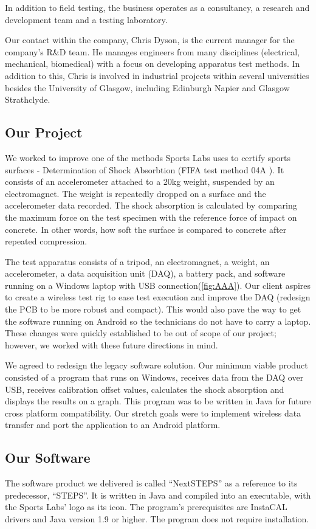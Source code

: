 \documentclass{l3proj}
\begin{document}
In addition to field testing, the business  operates as a consultancy, a research and development team and a testing laboratory.

Our contact within the company, Chris Dyson, is the current manager for the company's R\&D team. He manages engineers from many disciplines (electrical, mechanical, biomedical) with a focus on developing apparatus test methods. In addition to this, Chris is involved in industrial projects within several universities besides the University of Glasgow, including Edinburgh Napier and Glasgow Strathclyde.  
\subsection{Our Project}
We worked to improve one of the methods Sports Labs uses to certify sports surfaces - Determination of Shock Absorbtion (FIFA test method 04A \cite{fifa}). It consists of an accelerometer attached to a 20kg weight, suspended by an electromagnet. The weight is repeatedly dropped on a surface and the accelerometer data recorded. The shock absorption is calculated by comparing the maximum force on the test specimen with the reference force of impact on concrete\cite{fifa}. In other words, how soft the surface is compared to concrete after repeated compression. 

The test apparatus consists of a tripod, an electromagnet, a weight, an accelerometer, a data acquisition unit (DAQ), a battery pack, and software running on a Windows laptop with USB connection(\ref{fig:AAA}). Our client aspires to create a wireless test rig to ease test execution and improve the DAQ (redesign the PCB to be more robust and compact). This would also pave the way to get the software running on Android so the technicians do not have to carry a laptop. These changes were quickly established to be out of scope of our project; however, we worked with these future directions in mind. 

We agreed to redesign the legacy software solution. Our minimum viable product consisted of a program that runs on Windows, receives data from the DAQ over USB, receives calibration offset values, calculates the shock absorption and displays the results on a graph. This program was to be written in Java for future cross platform compatibility. Our stretch goals were to implement wireless data transfer and port the application to an Android platform.


\subsection{Our Software}
The software product we delivered is called ``NextSTEPS'' as a reference to its predecessor, ``STEPS''. It is written in Java and compiled into an executable, with the Sports Labs' logo as its icon. The program's prerequisites are InstaCAL drivers and Java version 1.9 or higher. The program does not require installation.
\end{document}
